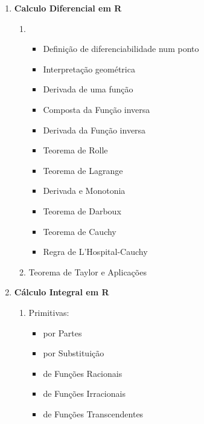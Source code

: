 \documentclass[12pt]{article}
\begin{document}
\begin{multicols}{2}
\begin{enumerate}[label=\arabic*.]
\begin{enumerate}
	\end{enumerate}
	
	\vspace{3mm}
	
	\item {\bfseries
		Calculo Diferencial em R
	}
	\begin{enumerate}
	[label=\theenumi\arabic*., left = -5.4mm]
		
		\item \
		\begin{itemize}[left = -9mm]
		
			\item Definição de diferenciabilidade
				 num ponto
			\item Interpretação geométrica
			\item Derivada de uma função
			\item Composta da Função inversa
			\item Derivada da Função inversa
			\item Teorema de Rolle
			\item Teorema de Lagrange
			\item Derivada e Monotonia
			\item Teorema de Darboux
			\item Teorema de Cauchy
			\item Regra de L'Hospital-Cauchy
		
		\end{itemize}
		
		\item Teorema de Taylor e Aplicações
		
	\end{enumerate}
	
	\vspace{3mm}
	
	\item {\bfseries
		Cálculo Integral em R
	}
	\begin{enumerate}
	[label=\theenumi\arabic*., left = -5.4mm]
	
		\item Primitivas:
		\begin{itemize}[left = -9mm]
			
			\item por Partes
			\item por Substituição
			\item de Funções Racionais
			\item de Funções Irracionais
			\item de Funções Transcendentes
			

\end{itemize}
\end{enumerate}
\end{enumerate}
\end{multicols}
\end{document}
